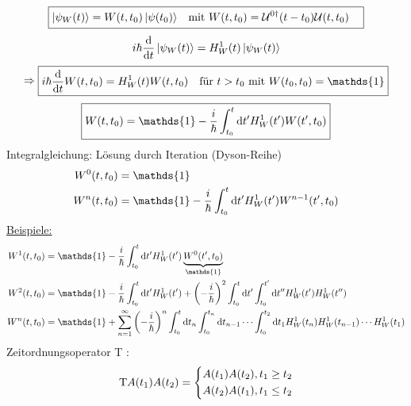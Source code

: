 		\begin{align*}
		\boxed{	
		\begin{aligned}
			\ket{\psi_W(t)} &= W(t,t_0) \ket{\psi(t_0)} &\text{mit~} W(t,t_0) &= \mathcal{U}^{0\dagger} (t-t_0) \mathcal{U} (t,t_0) 
		\end{aligned}
		}
		\end{align*}
		\begin{equation*}
			i \hbar \frac{\mathrm{d}}{\mathrm{d} t} \ket{\psi_W(t)} = H^1_W(t) \ket{\psi_W(t)}
		\end{equation*}	
		\begin{align*}
		\Rightarrow
		\boxed{	
			\begin{aligned}
				i \hbar \frac{\diff}{\diff t} W(t,t_0) 
				&= H^1_W(t) W(t,t_0) &\text{für~} t>t_0 \text{~mit~} W(t_0,t_0) = \mathds{1}
			\end{aligned}
		}
		\end{align*}
		\begin{equation*}
			\boxed{ W(t,t_0) = \mathds{1} 
				- \frac{i}{\hbar} \int_{t_0}^{t} \diff t' H^1_W(t') W(t',t_0)
				}
		\end{equation*}
	Integralgleichung: Lösung durch Iteration (Dyson-Reihe)
		\begin{align*}
			W^0(t,t_0) &= \mathds{1} \\
			W^n(t,t_0) &= \mathds{1} - \frac{i}{\hbar} \int_{t_0}^{t} \diff t' H^1_W(t') W^{n-1}(t',t_0)
		\end{align*}
	\underline{Beispiele:}
		\begin{align*}
			W^1(t,t_0) &= \mathds{1}
			- \frac{i}{\hbar} \int_{t_0}^{t} \diff t' H^1_W(t') \underbrace{W^{0}(t',t_0)}_{\substack{\mathds{1}}} \\
			W^2(t,t_0) &= \mathds{1} 
			- \frac{i}{\hbar} \int_{t_0}^{t} \diff t' H^1_W(t')
			+ \left( -\frac{i}{\hbar}\right)^2 \int_{t_0}^{t} \diff t' \int_{t_0}^{t'} \diff t'' H^1_W(t') H^1_W(t'') \\
			W^n(t,t_0) &= \mathds{1} 
			+ \sum_{n=1}^{\infty} \left(-\frac{i}{\hbar}\right)^n 
			\int_{t_0}^{t} \diff t_n
			\int_{t_0}^{t_n} \diff t_{n-1} \cdots 
			\int_{t_0}^{t_2} \diff t_1 H^1_W(t_n) H^1_W(t_{n-1}) \cdots H^1_W(t_1)
		\end{align*}
		Zeitordnungsoperator T : 
		\begin{align*}
		\mathrm{T} A(t_1) A(t_2) = 
		\left\{
		\begin{aligned}
		A(t_1) A(t_2) &, t_1 \geq t_2 \\
		A(t_2) A(t_1) &, t_1 \leq t_2 
		\end{aligned}
		\right.
		\end{align*}
